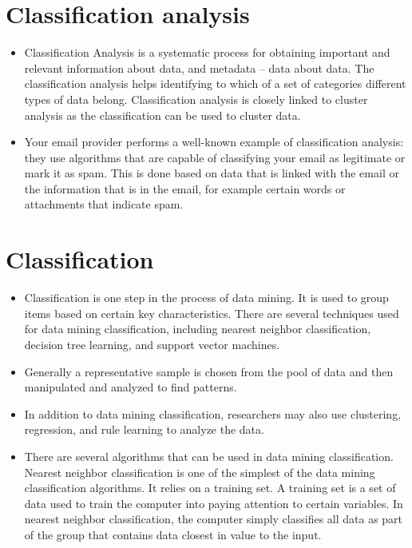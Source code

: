 \section{Classification analysis}
\begin{itemize}
\item Classification Analysis is a systematic process for obtaining important and relevant information about data, and metadata – data about data. The classification analysis helps identifying to which of a set of categories different types of data belong. Classification analysis is closely linked to cluster analysis as the classification can be used to cluster data.

\item Your email provider performs a well-known example of classification analysis: they use algorithms that are capable of classifying your email as legitimate or mark it as spam. This is done based on data that is linked with the email or the information that is in the email, for example certain words or attachments that indicate spam.
\end{itemize}
\section*{Classification}
\begin{itemize}
\item Classification is one step in the process of data mining. It is used to group items based on certain key characteristics. There are several techniques used for data mining classification, including nearest neighbor classification, decision tree learning, and support vector machines.

\item Generally a representative sample is chosen from the pool of data and then manipulated and analyzed to find patterns. 

\item In addition to data mining classification, researchers may also use clustering, regression, and rule learning to analyze the data.

\item There are several algorithms that can be used in data mining classification. Nearest neighbor classification is one of the simplest of the data mining classification algorithms. It relies on a training set. A training set is a set of data used to train the computer into paying attention to certain variables. In nearest neighbor classification, the computer simply classifies all data as part of the group that contains data closest in value to the input.
\end{itemize}


